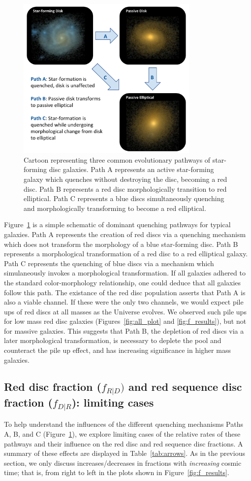 \documentclass[useAMS,usenatbib]{mn2e}
\begin{document}
\begin{figure}
\centering
\includegraphics[width=3.5in]{figures/cartoon.pdf}
\caption{Cartoon representing three common evolutionary pathways of star-forming disc galaxies. Path A represents an active star-forming galaxy which quenches without destroying the disc, becoming a red disc. Path B represents a red disc morphologically transition to red elliptical. Path C represents a blue discs simultaneously quenching and morphologically transforming to become a red elliptical. }
\label{fig:cartoon}
\end{figure}

Figure~\ref{fig:cartoon} is a simple schematic of dominant quenching pathways for typical galaxies. Path A represents the creation of red discs via a quenching mechanism which does not transform the morphology of a blue star-forming disc. Path B represents a morphological transformation of a red disc to a red elliptical galaxy. Path C represents the quenching of blue discs via a mechanism which simulaneously invokes a morphological transformation. If all galaxies adhered to the standard color-morphology relationship, one could deduce that all galaxies follow this path. The existance of the red disc population asserts that Path A is also a viable channel. If these were the only two channels, we would expect pile ups of red discs at all masses as the Universe evolves. We observed such pile ups for low mass red disc galaxies (Figures~\ref{fig:all_plot} and \ref{fig:f_results}), but not for massive galaxies. This suggests that Path B, the depletion of red discs via a later morphological transformation, is necessary to deplete the pool and counteract the pile up effect, and has increasing significance in higher mass galaxies.  


\subsection{Red disc fraction ($f_{R|D})$ and red sequence disc fraction ($f_{D|R}$): limiting cases}
To help understand the influences of the different quenching mechanisms Paths A, B, and C (Figure~\ref{fig:cartoon}), we explore limiting cases of the relative rates of these pathways and their influence on the red disc and red sequence disc fractions. A summary of these effects are displayed in Table~\ref{tab:arrows}. As in the previous section, we only discuss increases/decreases in fractions with \emph{increasing} cosmic time; that is, from right to left in the plots shown in Figure~\ref{fig:f_results}.
\end{document}
